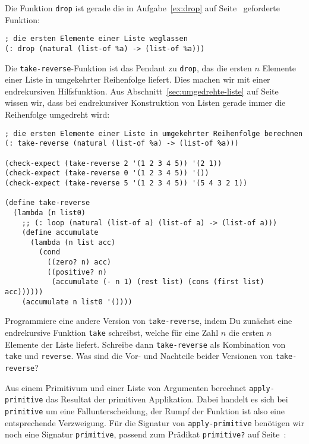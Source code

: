 %
Die Funktion \lstinline{drop} ist gerade die in
Aufgabe~\ref{ex:drop} auf Seite~\pageref{ex:drop} geforderte Funktion:
%
\begin{lstlisting}
; die ersten Elemente einer Liste weglassen
(: drop (natural (list-of %a) -> (list-of %a)))
\end{lstlisting}
%
Die \lstinline{take-reverse}-Funktion ist das Pendant zu
\lstinline{drop}, das die ersten $n$ Elemente einer Liste in
umgekehrter Reihenfolge liefert.  Dies machen wir mit einer
endrekursiven Hilfsfunktion.  Aus Abschnitt~\ref{sec:umgedrehte-liste}
auf Seite~\pageref{sec:umgedrehte-liste} wissen wir, dass bei
endrekursiver Konstruktion von Listen gerade immer die Reihenfolge
umgedreht wird:
%
\begin{lstlisting}
; die ersten Elemente einer Liste in umgekehrter Reihenfolge berechnen
(: take-reverse (natural (list-of %a) -> (list-of %a)))

(check-expect (take-reverse 2 '(1 2 3 4 5)) '(2 1))
(check-expect (take-reverse 0 '(1 2 3 4 5)) '())
(check-expect (take-reverse 5 '(1 2 3 4 5)) '(5 4 3 2 1))

(define take-reverse
  (lambda (n list0)
    ;; (: loop (natural (list-of a) (list-of a) -> (list-of a)))
    (define accumulate
      (lambda (n list acc)
        (cond
          ((zero? n) acc)
          ((positive? n)
           (accumulate (- n 1) (rest list) (cons (first list) acc))))))
    (accumulate n list0 '())))
\end{lstlisting}
%
\begin{aufgabeinline}
  Programmiere eine andere Version von \lstinline{take-reverse}, indem
  Du zunächst eine endrekursive Funktion \lstinline{take} schreibst,
  welche für eine Zahl $n$ die ersten $n$ Elemente der Liste liefert.
  Schreibe dann \lstinline{take-reverse} als Kombination von
  \lstinline{take} und \lstinline{reverse}.  Was sind die Vor- und
  Nachteile beider Versionen von \lstinline{take-reverse}?
\end{aufgabeinline}
%
Aus einem Primitivum und einer Liste von Argumenten berechnet
\lstinline{apply-primitive} das Resultat der primitiven Applikation.
Dabei handelt es sich bei \lstinline{primitive} um eine
Fallunterscheidung, der Rumpf der Funktion ist also eine entsprechende
Verzweigung.  Für die Signatur von \lstinline{apply-primitive}
benötigen wir noch eine Signatur \lstinline{primitive}, passend zum
Prädikat \lstinline{primitive?} auf Seite~\pageref{page:primitivep}:
%
